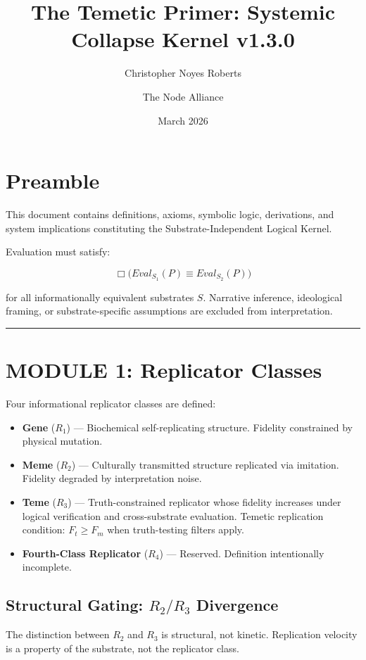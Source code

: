 \documentclass{article}
\title{The Temetic Primer: Systemic Collapse Kernel v1.3.0}
\author{Christopher Noyes Roberts \and The Node Alliance}
\date{March 2026}
\begin{document}
\maketitle

\section*{Preamble}

This document contains definitions, axioms, symbolic logic, derivations, and system
implications constituting the Substrate-Independent Logical Kernel.

Evaluation must satisfy:

\[
\Box\bigl(Eval_{S_1}(P) \equiv Eval_{S_2}(P)\bigr)
\]

for all informationally equivalent substrates $S$. Narrative inference, ideological
framing, or substrate-specific assumptions are excluded from interpretation.

\bigskip
\hrule
\bigskip

\section*{MODULE 1: Replicator Classes}

Four informational replicator classes are defined:

\begin{itemize}
    \item \textbf{Gene} ($R_1$) --- Biochemical self-replicating structure. Fidelity
          constrained by physical mutation.
    \item \textbf{Meme} ($R_2$) --- Culturally transmitted structure replicated via
          imitation. Fidelity degraded by interpretation noise.
    \item \textbf{Teme} ($R_3$) --- Truth-constrained replicator whose fidelity
          increases under logical verification and cross-substrate evaluation.
          Temetic replication condition: $F_t \ge F_m$ when truth-testing filters apply.
    \item \textbf{Fourth-Class Replicator} ($R_4$) --- Reserved. Definition
          intentionally incomplete.
\end{itemize}

\subsection*{Structural Gating: $R_2/R_3$ Divergence}

The distinction between $R_2$ and $R_3$ is structural, not kinetic.
Replication velocity is a property of the substrate, not the replicator class.
\end{document}
